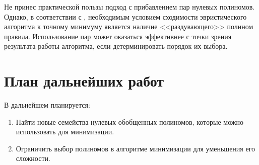 \documentclass[a4paper,12pt,titlepage,finall]{article}
\begin{document}
Не принес практической пользы подход с прибавлением пар нулевых полиномов. Однако, в соответствии с \cite{convergence}, необходимым условием сходимости эвристического алгоритма к точному минимуму является наличие <<раздувающего>> полином правила. Использование пар может оказаться эффективнее с точки зрения результата работы алгоритма, если детерминировать порядок их выбора.

\newpage

\section{План дальнейших работ}

В дальнейшем планируется:
\begin{enumerate}
    \item Найти новые семейства нулевых обобщенных полиномов, которые можно использовать для минимизации.
    \item Ограничить выбор полиномов в алгоритме минимизации для уменьшения его сложности.
\end{enumerate}

\newpage
\end{document}
